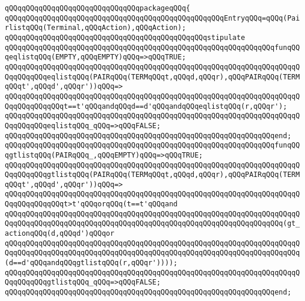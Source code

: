 \verb|qQQqqQQqqQQqqQQqqQQqqQQqqQQqqQQqpackageqQQq{|\newline
\verb|qQQqqQQqqQQqqQQqqQQqqQQqqQQqqQQqqQQqqQQqqQQqqQQqqQQqEntryqQQq=qQQq(PairlistqQQq(Terminal,qQQqAction),qQQqAction);|\newline
\newline
\verb|qQQqqQQqqQQqqQQqqQQqqQQqqQQqqQQqqQQqqQQqqQQqqQQqstipulate|\newline
\verb|qQQqqQQqqQQqqQQqqQQqqQQqqQQqqQQqqQQqqQQqqQQqqQQqqQQqqQQqqQQqqQQqfunqQQqeqlistqQQq(EMPTY,qQQqEMPTY)qQQq=>qQQqTRUE;|\newline
\verb|qQQqqQQqqQQqqQQqqQQqqQQqqQQqqQQqqQQqqQQqqQQqqQQqqQQqqQQqqQQqqQQqqQQqqQQqqQQqqQQqeqlistqQQq(PAIRqQQq(TERMqQQqt,qQQqd,qQQqr),qQQqPAIRqQQq(TERMqQQqt',qQQqd',qQQqr'))qQQq=>|\newline
\verb|qQQqqQQqqQQqqQQqqQQqqQQqqQQqqQQqqQQqqQQqqQQqqQQqqQQqqQQqqQQqqQQqqQQqqQQqqQQqqQQqqQQqt==t'qQQqandqQQqd==d'qQQqandqQQqeqlistqQQq(r,qQQqr');|\newline
\verb|qQQqqQQqqQQqqQQqqQQqqQQqqQQqqQQqqQQqqQQqqQQqqQQqqQQqqQQqqQQqqQQqqQQqqQQqqQQqqQQqeqlistqQQq_qQQq=>qQQqFALSE;|\newline
\verb|qQQqqQQqqQQqqQQqqQQqqQQqqQQqqQQqqQQqqQQqqQQqqQQqqQQqqQQqqQQqqQQqend;|\newline
\newline
\verb|qQQqqQQqqQQqqQQqqQQqqQQqqQQqqQQqqQQqqQQqqQQqqQQqqQQqqQQqqQQqqQQqfunqQQqgtlistqQQq(PAIRqQQq_,qQQqEMPTY)qQQq=>qQQqTRUE;|\newline
\verb|qQQqqQQqqQQqqQQqqQQqqQQqqQQqqQQqqQQqqQQqqQQqqQQqqQQqqQQqqQQqqQQqqQQqqQQqqQQqqQQqgtlistqQQq(PAIRqQQq(TERMqQQqt,qQQqd,qQQqr),qQQqPAIRqQQq(TERMqQQqt',qQQqd',qQQqr'))qQQq=>|\newline
\verb|qQQqqQQqqQQqqQQqqQQqqQQqqQQqqQQqqQQqqQQqqQQqqQQqqQQqqQQqqQQqqQQqqQQqqQQqqQQqqQQqqQQqt>t'qQQqorqQQq(t==t'qQQqand|\newline
\verb|qQQqqQQqqQQqqQQqqQQqqQQqqQQqqQQqqQQqqQQqqQQqqQQqqQQqqQQqqQQqqQQqqQQqqQQqqQQqqQQqqQQqqQQqqQQqqQQqqQQqqQQqqQQqqQQqqQQqqQQqqQQqqQQqqQQqqQQq(gt_actionqQQq(d,qQQqd')qQQqor|\newline
\verb|qQQqqQQqqQQqqQQqqQQqqQQqqQQqqQQqqQQqqQQqqQQqqQQqqQQqqQQqqQQqqQQqqQQqqQQqqQQqqQQqqQQqqQQqqQQqqQQqqQQqqQQqqQQqqQQqqQQqqQQqqQQqqQQqqQQqqQQqqQQq(d==d'qQQqandqQQqgtlistqQQq(r,qQQqr'))));|\newline
\verb|qQQqqQQqqQQqqQQqqQQqqQQqqQQqqQQqqQQqqQQqqQQqqQQqqQQqqQQqqQQqqQQqqQQqqQQqqQQqqQQqgtlistqQQq_qQQq=>qQQqFALSE;|\newline
\verb|qQQqqQQqqQQqqQQqqQQqqQQqqQQqqQQqqQQqqQQqqQQqqQQqqQQqqQQqqQQqqQQqend;|\newline
